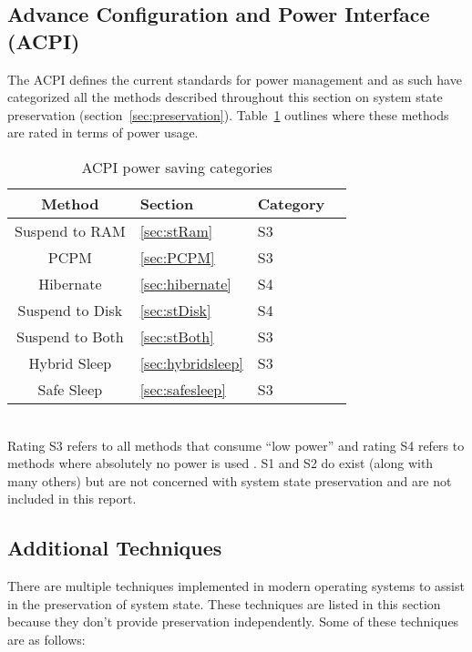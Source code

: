 \documentclass[a4paper,12pt]{article}
\begin{document}
\subsection{Advance Configuration and Power Interface (ACPI)}
The ACPI defines the current standards for power management \citep{ACPI} and as such have categorized all the methods described throughout this section on system state preservation (section~\ref{sec:preservation}). Table~\ref{table:categories} outlines where these methods are rated in terms of power usage.
\begin{table}[h!]
    \begin{center}
        \leavevmode
        \begin{tabular}{|cll|l|}\hline
            Method & Section & Category\\[0.1cm]\hline
            Suspend to RAM & \ref{sec:stRam} & S3\\
            PCPM & \ref{sec:PCPM} & S3 \\
            Hibernate & \ref{sec:hibernate} & S4\\
            Suspend to Disk & \ref{sec:stDisk} & S4 \\
            Suspend to Both & \ref{sec:stBoth} & S3 \\
            Hybrid Sleep & \ref{sec:hybridsleep} & S3 \\
            Safe Sleep & \ref{sec:safesleep} & S3 \\\hline
        \end{tabular}
    \end{center}
    \caption{ACPI power saving categories \citep{ACPI}}
    \label{table:categories}
\end{table}
\\Rating S3 refers to all methods that consume ``low power'' and rating S4 refers to methods where absolutely no power is used \citep{ACPI}. S1 and S2 do exist (along with many others) but are not concerned with system state preservation and are not included in this report.

\subsection{Additional Techniques}
There are multiple techniques implemented in modern operating systems to assist in the preservation of system state. These techniques are listed in this section because they don't provide preservation independently.
Some of these techniques are as follows:
\end{document}
